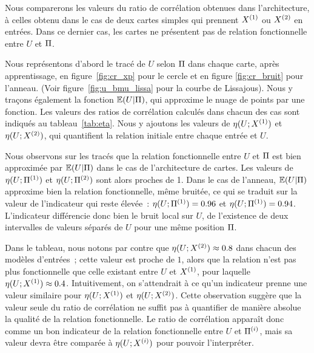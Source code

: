 \documentclass[../main]{subfiles}
\begin{document}
Nous comparerons les valeurs du ratio de corrélation obtenues dans l'architecture, à celles obtenu dans le cas de deux cartes simples qui prennent $X^{({1})}$ ou $X^{({2})}$ en entrées. 
Dans ce dernier cas, les cartes ne présentent pas de relation fonctionnelle entre $U$ et $\Pi$.

Nous représentons d'abord le tracé de $U$ selon $\Pi$ dans chaque carte, après apprentissage, en figure~\ref{fig:cr_xp} pour le cercle et en figure \ref{fig:cr_bruit} pour l'anneau. (Voir figure~\ref{fig:u_bmu_lissa} pour la courbe de Lissajous).
Nous y traçons également la fonction $\mathbb{E}(U|\Pi)$, qui approxime le nuage de points par une fonction. 
Les valeurs des ratios de corrélation calculés dans chacun des cas sont indiqués au tableau~\ref{tab:eta}.
Nous y ajoutons les valeurs de $\eta(U;X^{({1})})$ et $\eta(U;X^{({2})})$, qui quantifient la relation initiale entre chaque entrée et $U$.


Nous observons sur les tracés que la relation fonctionnelle entre $U$ et $\Pi$ est bien approximée par $\mathbb{E}(U|\Pi)$ dans le cas de l'architecture de cartes. Les valeurs de $\eta(U;\Pi^{({1})})$ et $\eta(U;\Pi^{({2})})$ sont alors proches de 1. 
Dans le cas de l'anneau, $\mathbb{E}(U|\Pi)$ approxime bien la relation fonctionnelle, même bruitée, ce qui se traduit sur la valeur de l'indicateur qui reste élevée~: $\eta(U;\Pi^{({1})}) = 0.96$ et  $\eta(U;\Pi^{({1})}) = 0.94$. 
L'indicateur différencie donc bien le bruit local sur $U$, de l'existence de deux intervalles de valeurs séparés de $U$ pour une même position $\Pi$.

Dans le tableau, nous notons par contre que $\eta(U;X^{({2})}) \approx 0.8$ dans chacun des modèles d'entrées~; cette valeur est proche de $1$, alors que la relation n'est pas \og plus fonctionnelle \fg{} que celle existant entre $U$ et $X^{({1})}$, pour laquelle $\eta(U;X^{({1})}) \approx 0.4$. Intuitivement, on s'attendrait à ce qu'un indicateur prenne une valeur similaire pour $\eta(U;X^{({1})})$ et $\eta(U;X^{({2})})$. Cette observation suggère que la valeur seule du ratio de corrélation ne suffit pas à quantifier de manière absolue la qualité de la relation fonctionnelle.
Le ratio de corrélation apparaît donc comme un bon indicateur de la relation fonctionnelle entre $U$ et $\Pi^{({i})}$, mais sa valeur devra être comparée à $\eta(U;X^{({i})})$ pour pouvoir l'interpréter.
\end{document}
